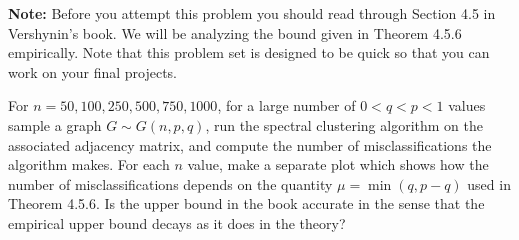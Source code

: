 \documentclass[12pt,letterpaper,cm]{hmcpset}
\begin{document}
\textbf{Note:} Before you attempt this problem you should read through Section 4.5 in Vershynin's book. We will be analyzing the bound given in Theorem 4.5.6 empirically. Note that this problem set is designed to be quick so that you can work on your final projects.

\begin{problem}
    For $n=50,100,250,500,750,1000$, for a large number of $0 < q < p < 1$ values sample a graph $G \sim G(n,p,q)$, run the spectral clustering algorithm on the associated adjacency matrix, and compute the number of misclassifications the algorithm makes. For each $n$ value, make a separate plot which shows how the number of misclassifications depends on the quantity $\mu = \min(q,p-q)$ used in Theorem 4.5.6. Is the upper bound in the book accurate in the sense that the empirical upper bound decays as it does in the theory?
\end{problem}

\begin{solution}
    \vfill
\end{solution}
\clearpage
\end{document}
